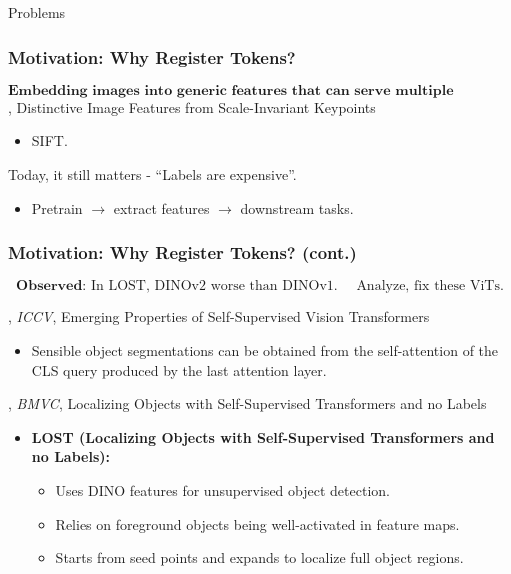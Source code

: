 \documentclass[aspectratio=169]{beamer}
\begin{document}
\begin{section}{Problems}
\begin{frame}
\frametitle{Motivation: Why Register Tokens?}

\vspace{4.2em}
$$
\boxed{\textbf{Embedding images into generic features that can serve multiple purposes in CV}}
$$
\vspace{4.2em}
\cite{loweDistinctiveImageFeatures2004}, Distinctive Image Features from Scale-Invariant Keypoints
\begin{itemize}
    \item SIFT.
\end{itemize}
Today, it still matters - ``Labels are expensive''.
\begin{itemize}
    \item Pretrain $\rightarrow$ extract features $\rightarrow$ downstream tasks.
\end{itemize}
\end{frame}

\begin{frame}
\frametitle{Motivation: Why Register Tokens? (cont.)}

$$
\boxed{\textbf{Observed: } \text{In LOST, DINOv2 worse than DINOv1. } \quad \text{Analyze, fix these ViTs.}}
$$

\vspace{1em}

\cite{caronEmergingPropertiesSelfsupervised2021}, \textit{ICCV}, Emerging Properties of Self-Supervised Vision Transformers

\vspace{1em}

\begin{itemize}
    \item Sensible object segmentations can be obtained from the self-attention of the CLS query produced by the last attention layer.
\end{itemize}

\vspace{1em}

\cite{simeoniLocalizingObjectsSelfsupervised2021}, \textit{BMVC}, Localizing Objects with Self-Supervised Transformers and no Labels

\vspace{1em}

\begin{itemize}
    \item \textbf{LOST (Localizing Objects with Self-Supervised Transformers and no Labels):}
    \begin{itemize}
        \item Uses DINO features for unsupervised object detection.
        \item Relies on foreground objects being well-activated in feature maps.
        \item Starts from seed points and expands to localize full object regions.
    \end{itemize}
\end{itemize}


\end{frame}
\end{section}
\end{document}
